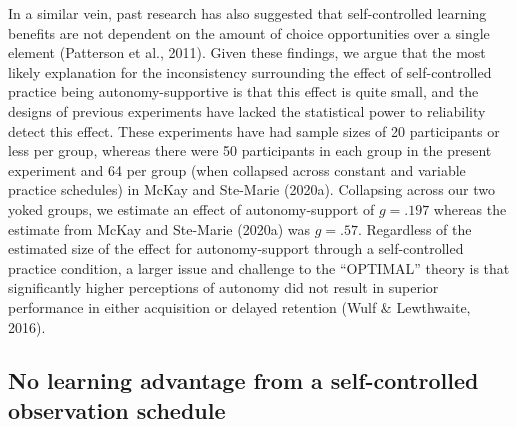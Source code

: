 \documentclass[
  english,
  jou]{apa7}
\begin{document}
In a similar vein, past research has also suggested that self-controlled learning benefits are not dependent on the amount of choice opportunities over a single element (Patterson et al., 2011). Given these findings, we argue that the most likely explanation for the inconsistency surrounding the effect of self-controlled practice being autonomy-supportive is that this effect is quite small, and the designs of previous experiments have lacked the statistical power to reliability detect this effect. These experiments have had sample sizes of 20 participants or less per group, whereas there were 50 participants in each group in the present experiment and 64 per group (when collapsed across constant and variable practice schedules) in McKay and Ste-Marie (2020a). Collapsing across our two yoked groups, we estimate an effect of autonomy-support of \(g = .197\) whereas the estimate from McKay and Ste-Marie (2020a) was \(g = .57\). Regardless of the estimated size of the effect for autonomy-support through a self-controlled practice condition, a larger issue and challenge to the ``OPTIMAL'' theory is that significantly higher perceptions of autonomy did not result in superior performance in either acquisition or delayed retention (Wulf \& Lewthwaite, 2016).

\hypertarget{no-learning-advantage-from-a-self-controlled-observation-schedule}{%
\subsection{No learning advantage from a self-controlled observation schedule}\label{no-learning-advantage-from-a-self-controlled-observation-schedule}}
\end{document}
